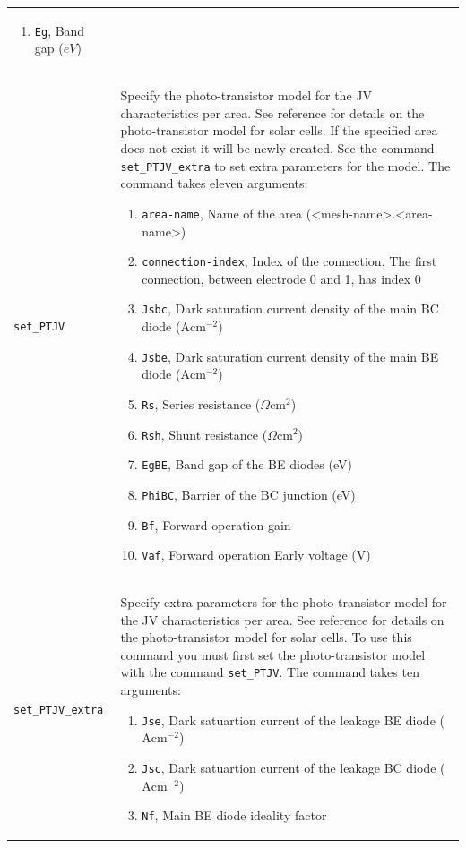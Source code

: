\documentclass[noshowpacs,preprintnumbers,amsmath,amssymb, letter]{revtex4}
\begin{document}
\begin{longtable}{p{}p{}}
\begin{enumerate}
\item \texttt{Eg}, Band gap ($eV$)
\end{enumerate}\\
\texttt{set\_PTJV}	&  Specify the photo-transistor model for the JV characteristics per area.  See reference \cite{Walter:photo-T} for details on the photo-transistor model for solar cells. If the specified area does not exist it will be newly created. See the command \texttt{set\_PTJV\_extra} to set extra parameters for the model. The command takes eleven arguments:
\begin{enumerate}
\item \texttt{area-name}, Name of the area (\textless mesh-name\textgreater .\textless area-name\textgreater )
\item \texttt{connection-index}, Index of the connection. The first connection, between electrode 0 and 1,  has index 0
\item \texttt{Jsbc},  Dark saturation current density of the main BC diode ($\text{A}\text{cm}^{-2}$)
\item \texttt{Jsbe},  Dark saturation current density of the main BE diode  ($\text{A}\text{cm}^{-2}$)
\item \texttt{Rs}, Series resistance ($\Omega \text{cm}^2$)
\item \texttt{Rsh}, Shunt resistance ($\Omega \text{cm}^2$)
\item \texttt{EgBE},  Band gap of the BE diodes (eV)
\item \texttt{PhiBC},  Barrier of the BC junction (eV)
\item \texttt{Bf},  Forward operation gain 
\item \texttt{Vaf},  Forward operation Early voltage (V)
\end{enumerate}\\
\texttt{set\_PTJV\_extra}	&  Specify extra parameters for the photo-transistor model for the JV characteristics per area. See reference \cite{Walter:photo-T} for details on the photo-transistor model for solar cells. To use this command you must first set the photo-transistor model with the command \texttt{set\_PTJV}. The command takes ten arguments:
\begin{enumerate}
\item \texttt{Jse},  Dark satuartion current of the leakage BE diode ($\text{A}\text{cm}^{-2}$)
\item \texttt{Jsc},  Dark satuartion current of the leakage BC diode ($\text{A}\text{cm}^{-2}$)
\item \texttt{Nf},  Main BE diode ideality factor 

\end{enumerate}
\end{longtable}
\end{document}
